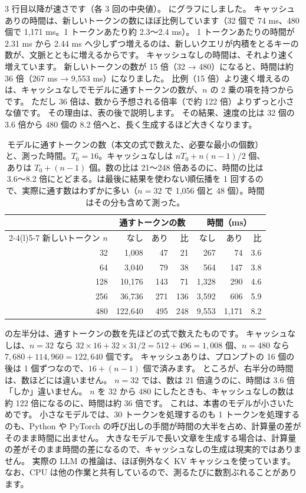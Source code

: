 3 行目以降が速さです（各 3 回の中央値）。
にグラフにしました。
キャッシュありの時間は、新しいトークンの数にほぼ比例しています（32 個で 74 ms、480 個で 1,171 ms。1 トークンあたり約 2.3〜2.4 ms）。
1 トークンあたりの時間が 2.31 ms から 2.44 ms へ少しずつ増えるのは、新しいクエリが内積をとるキーの数が、文脈とともに増えるからです。
キャッシュなしの時間は、それより速く増えています。
新しいトークンの数が 15 倍（32 → 480）になると、時間は約 36 倍（267 ms → 9,553 ms）になりました。
比例（15 倍）より速く増えるのは、キャッシュなしでモデルに通すトークンの数が、$n$ の 2 乗の項を持つからです。
ただし 36 倍は、数から予想される倍率（で約 122 倍）よりずっと小さな値です。
その理由は、表の後で説明します。
その結果、速度の比は 32 個の 3.6 倍から 480 個の 8.2 倍へと、長く生成するほど大きくなります。

\begin{table}[tbp]
\centering
\caption{モデルに通すトークンの数（本文の式で数えた、必要な最小の個数）と、測った時間。$T_0=16$。キャッシュなしは $nT_0+n(n-1)/2$ 個、ありは $T_0+(n-1)$ 個。数の比は 21〜248 倍あるのに、時間の比は 3.6〜8.2 倍にとどまる。は最後に結果を使わない順伝播を 1 回するので、実際に通す数はわずかに多い（$n=32$ で 1,056 個と 48 個）。時間はその分も含めて測った。}
\label{tab:ma-kv-count}
\small
\begin{tabular}{@{}rrrrrrr@{}}
\toprule
 & \multicolumn{3}{c}{通すトークンの数} & \multicolumn{3}{c}{時間（ms）} \\
\cmidrule(lr){2-4}\cmidrule(l){5-7}
新しいトークン $n$ & なし & あり & 比 & なし & あり & 比 \\
\midrule
32 & 1,008 & 47 & 21 & 267 & 74 & 3.6 \\
64 & 3,040 & 79 & 38 & 564 & 147 & 3.8 \\
128 & 10,176 & 143 & 71 & 1,328 & 290 & 4.6 \\
256 & 36,736 & 271 & 136 & 3,592 & 606 & 5.9 \\
480 & 122,640 & 495 & 248 & 9,553 & 1,171 & 8.2 \\
\bottomrule
\end{tabular}
\end{table}

の左半分は、通すトークンの数を先ほどの式で数えたものです。
キャッシュなしは、$n=32$ なら $32\times16+32\times31/2=512+496=1{,}008$ 個、$n=480$ なら $7{,}680+114{,}960=122{,}640$ 個です。
キャッシュありは、プロンプトの 16 個の後は 1 個ずつなので、$16+(n-1)$ 個で済みます。
ところが、右半分の時間は、数ほどには違いません。
$n=32$ では、数は 21 倍違うのに、時間は 3.6 倍「しか」違いません。
$n$ を 32 から 480 にしたときも、キャッシュなしの数は約 122 倍になるのに、時間は約 36 倍です。
これは、本書のモデルが小さいためです。
小さなモデルでは、30 トークンを処理するのも 1 トークンを処理するのも、Python や PyTorch の呼び出しの手間が時間の大半を占め、計算量の差がそのまま時間に出ません。
大きなモデルで長い文章を生成する場合は、計算量の差がそのまま時間の差になるので、キャッシュなしの生成は現実的ではありません。
実際の LLM の推論は、ほぼ例外なく KV キャッシュを使っています。
なお、CPU は他の作業と共有しているので、測るたびに数割ぶれることがあります。

